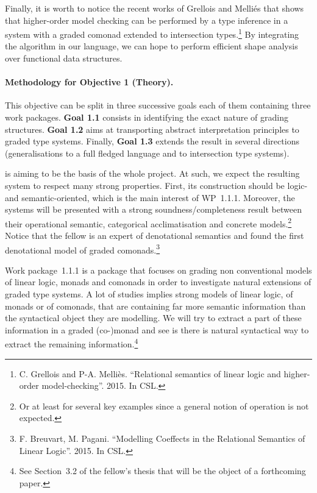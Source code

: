\documentclass{article}[11pt]
\begin{document}
Finally, it is worth to notice the recent works of Grellois and Melli\'es that shows that higher-order model checking can be performed by a type inference in a system with a graded comonad extended to intersection types.\footnote{C. Grellois and P-A. Melli\`es. ``Relational semantics of linear logic and higher-order model-checking''. 2015. In CSL.} By integrating the algorithm in our language, we can hope to perform efficient shape analysis over functional data structures.




\paragraph{Methodology for Objective 1 (Theory).}

This objective can be split in three successive goals each of them containing three work packages. {\bf Goal 1.1} consists in identifying the exact nature of grading structures. {\bf Goal 1.2} aims at transporting abstract interpretation principles to graded type systems. Finally, {\bf Goal 1.3} extends the result in several directions (generalisations to a full fledged language and to intersection type systems).

 is aiming to be the basis of the whole project. At such, we expect the resulting system to respect many strong properties. First, its construction should be logic- and semantic-oriented, which is the main interest of WP~1.1.1. Moreover, the systems will be presented with a strong soundness/completeness result between their operational semantic, categorical acclimatisation and concrete models.\footnote{Or at least for several key examples since a general notion of operation is not expected.} Notice that the fellow is an expert of denotational semantics and found the first denotational model of graded comonads.\footnote{F. Breuvart, M. Pagani. ``Modelling Coeffects in the Relational Semantics of Linear Logic''. 2015. In CSL.}

 Work package~1.1.1 is a package that focuses on grading non conventional models of linear logic, monads and comonads in order to investigate natural extensions of graded type systems. A lot of studies implies strong models of linear logic, of monads or of comonads, that are containing far more semantic information than the syntactical object they are modelling. We will try to extract a part of these information in a graded (co-)monad and see is there is natural syntactical way to extract the remaining information.\footnote{See Section~3.2 of the fellow's thesis that will be the object of a forthcoming paper.}
\end{document}
